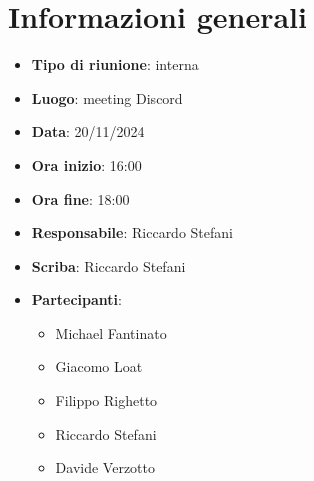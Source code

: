 


\section{Informazioni generali}

\begin{itemize}
    \item \textbf{Tipo di riunione}: interna
    \item \textbf{Luogo}: meeting Discord
    \item \textbf{Data}: 20/11/2024
    \item \textbf{Ora inizio}: 16:00
    \item \textbf{Ora fine}: 18:00
    \item \textbf{Responsabile}: Riccardo Stefani
    \item \textbf{Scriba}: Riccardo Stefani
    \item \textbf{Partecipanti}:
    \begin{itemize}
        \item Michael Fantinato
        \item Giacomo Loat
        \item Filippo Righetto
        \item Riccardo Stefani
        \item Davide Verzotto
    \end{itemize}
\end{itemize}
